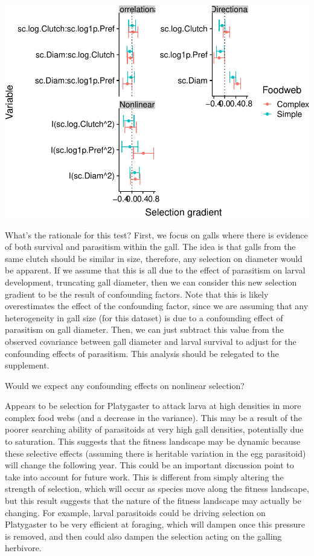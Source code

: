 \documentclass[]{elsarticle} %
\makeatletter
\def\maxwidth{\ifdim\Gin@nat@width>\linewidth\linewidth
\else\Gin@nat@width\fi}
\let\Oldincludegraphics\includegraphics
\renewcommand{\includegraphics}[1]{\Oldincludegraphics[width=\maxwidth]{#1}}
\makeatother
\begin{document}
\includegraphics{ms_complexity_selection_files/figure-latex/Get Selection Gradients for GLMER-2.pdf}

What's the rationale for this test? First, we focus on galls where there
is evidence of both survival and parasitism within the gall. The idea is
that galls from the same clutch should be similar in size, therefore,
any selection on diameter would be apparent. If we assume that this is
all due to the effect of parasitism on larval development, truncating
gall diameter, then we can consider this new selection gradient to be
the result of confounding factors. Note that this is likely
overestimates the effect of the confounding factor, since we are
assuming that any heterogeneity in gall size (for this dataset) is due
to a confounding effect of parasitism on gall diameter. Then, we can
just subtract this value from the observed covariance between gall
diameter and larval survival to adjust for the confounding effects of
parasitism. This analysis should be relegated to the supplement.

Would we expect any confounding effects on nonlinear selection?

Appears to be selection for Platygaster to attack larva at high
densities in more complex food webs (and a decrease in the variance).
This may be a result of the poorer searching ability of parasitoids at
very high gall densities, potentially due to saturation. This suggests
that the fitness landscape may be dynamic because these selective
effects (assuming there is heritable variation in the egg parasitoid)
will change the following year. This could be an important discussion
point to take into account for future work. This is different from
simply altering the strength of selection, which will occur as species
move along the fitness landscape, but this result suggests that the
nature of the fitness landscape may actually be changing. For example,
larval parasitoids could be driving selection on Platygaster to be very
efficient at foraging, which will dampen once this pressure is removed,
and then could also dampen the selection acting on the galling
herbivore.
\end{document}
